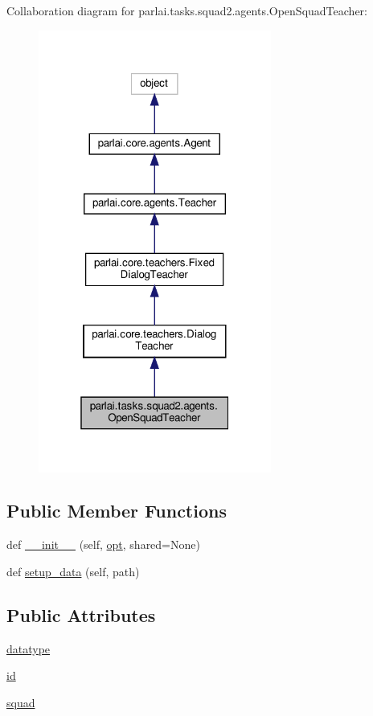 Collaboration diagram for parlai.\+tasks.\+squad2.\+agents.\+Open\+Squad\+Teacher\+:
\nopagebreak
\begin{figure}[H]
\begin{center}
\leavevmode
\includegraphics[width=217pt]{classparlai_1_1tasks_1_1squad2_1_1agents_1_1OpenSquadTeacher__coll__graph}
\end{center}
\end{figure}
\subsection*{Public Member Functions}
\begin{DoxyCompactItemize}
\item 
def \hyperlink{classparlai_1_1tasks_1_1squad2_1_1agents_1_1OpenSquadTeacher_a97032124add4cb349ff65ac04900da82}{\+\_\+\+\_\+init\+\_\+\+\_\+} (self, \hyperlink{classparlai_1_1core_1_1agents_1_1Teacher_a3ce6243860ce978a897922863ed32fa4}{opt}, shared=None)
\item 
def \hyperlink{classparlai_1_1tasks_1_1squad2_1_1agents_1_1OpenSquadTeacher_a7095abdf14125fc5cdae594fb63b71a0}{setup\+\_\+data} (self, path)
\end{DoxyCompactItemize}
\subsection*{Public Attributes}
\begin{DoxyCompactItemize}
\item 
\hyperlink{classparlai_1_1tasks_1_1squad2_1_1agents_1_1OpenSquadTeacher_ac0e68cddc67c52ee994725567a6ff45e}{datatype}
\item 
\hyperlink{classparlai_1_1tasks_1_1squad2_1_1agents_1_1OpenSquadTeacher_afee4b62658417abd64ef8bd57bbf6620}{id}
\item 
\hyperlink{classparlai_1_1tasks_1_1squad2_1_1agents_1_1OpenSquadTeacher_a80a634305ad2a0af202031e430ddf3af}{squad}
\end{DoxyCompactItemize}
